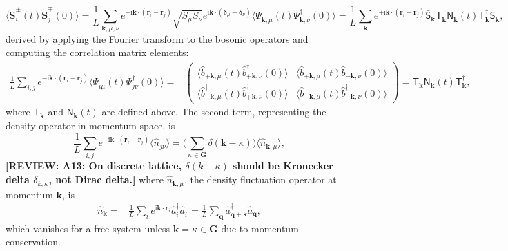 \documentclass[aps, prx, nofootinbib, superscriptaddress]{revtex4-2}
\newcommand{\REVIEW}[1]{{\color{reviewcolor}\bfseries [REVIEW: #1]}}
\newcommand{\kvec}{\mathbf{k}}
\newcommand{\ri}{\mathrm{i}}
\begin{document}
\begin{equation}
    \big\langle \widetilde{\mathbf{S}}_{i}^{\pm}(t) \widetilde{\mathbf{S}}_{j}^{\mp}(0) \big\rangle
    = \frac{1}{L} \sum_{\kvec, \mu, \nu } 
    e^{ + \ri \kvec \cdot (\mathbf{r}_{i} - \mathbf{r}_{j} )}
    \sqrt{S_{\mu} S_{\nu}}
    e^{ \ri \kvec \cdot (\mathbf{\delta}_{\mu} - \mathbf{\delta}_{\nu}) }
    \big\langle \Psi_{\kvec, \mu}^{\phantom \dagger}(t) \Psi_{\kvec, \nu}^{\dagger}(0) \big\rangle
    = \frac{1}{L} \sum_{\kvec}
    e^{ + \ri \kvec \cdot (\mathbf{r}_{i} - \mathbf{r}_{j} )}
    \bar{\mathsf{S}}_{\kvec}^{\phantom \dagger} 
    \mathsf{T}_{\kvec}^{\phantom \dagger}
    \mathsf{N}_{\kvec}^{\phantom \dagger} (t)
    \mathsf{T}_{\kvec}^{\dagger} 
    \mathsf{S}_{\kvec}^{\phantom \dagger},
\end{equation}
derived by applying the Fourier transform to the bosonic operators and computing the correlation matrix elements:
\begin{align}
    \frac{1}{L} \sum_{i,j} e^{ - \ri \kvec \cdot (\mathbf{r}_{i} - \mathbf{r}_{j} )} 
    \big\langle \Psi_{i\mu}^{\phantom \dagger}(t) \Psi_{j\nu}^{\dagger}(0) \big\rangle 
    = & 
    \begin{pmatrix}
        \big\langle \hat{b}_{+\kvec, \mu}^{\phantom \dagger} (t) \hat{b}_{+\kvec, \nu}^{\dagger}          (0) \big\rangle &
        \big\langle \hat{b}_{+\kvec, \mu}^{\phantom \dagger} (t) \hat{b}_{-\kvec, \nu}^{\phantom \dagger} (0) \big\rangle \\
        \big\langle \hat{b}_{-\kvec, \mu}^{\dagger}          (t) \hat{b}_{+\kvec, \nu}^{\dagger}          (0) \big\rangle &
        \big\langle \hat{b}_{-\kvec, \mu}^{\phantom \dagger} (t) \hat{b}_{-\kvec, \nu}^{\dagger}          (0) \big\rangle 
    \end{pmatrix}
    = \mathsf{T}_{\kvec}^{\phantom\dagger} \mathsf{N}_{\kvec}^{\phantom\dagger} (t) \mathsf{T}_{\kvec}^{\dagger},
\end{align}
where $\mathsf{T}_{\kvec}$ and $\mathsf{N}_{\kvec}(t)$ are defined above. The second term, representing the density operator in momentum space, is
\begin{equation}
    \frac{1}{L} \sum_{i,j} e^{- \ri \kvec \cdot (\mathbf{r}_{i} - \mathbf{r}_{j})} \langle \hat{n}_{j\nu} \rangle
    = \Big( \sum_{\kappa \in \mathbf{G}} \delta(\kvec - \kappa) \Big) \langle \hat{n}_{\kvec, \mu} \rangle,
\end{equation}
\REVIEW{A13: On discrete lattice, $\delta(k-\kappa)$ should be Kronecker delta $\delta_{k,\kappa}$, not Dirac delta.}
where $\hat{n}_{\kvec, \mu}$, the density fluctuation operator at momentum $\kvec$, is
\begin{align*}
    \hat{n}_{\kvec} 
    = & \frac{1}{L} 
    \sum_{i} e^{\ri \kvec \cdot \mathbf{r}_{i}} \hat{a}^{\dagger}_{i} \hat{a}_{i}^{\phantom \dagger} 
    = \frac{1}{L}  \sum_{\mathbf{q}} \hat{a}_{\mathbf{q} + \kvec}^{\dagger} \hat{a}_{\mathbf{q}}^{\phantom \dagger},
\end{align*}
which vanishes for a free system unless $\kvec = \kappa \in \mathbf{G}$ due to momentum conservation.
\end{document}
